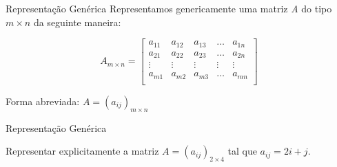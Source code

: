 \documentclass[aspectratio=169,xcolor=dvipsnames]{beamer}
\begin{document}

\begin{frame}{Representação Genérica}
  Representamos genericamente uma matriz \textit{A} do tipo $m \times n$ da seguinte maneira:

  \begin{equation*}
    A_{m \times n} = \begin{bmatrix}
      a_{11} & a_{12} & a_{13} & \dots & a_{1n} \\
      a_{21} & a_{22} & a_{23} & \dots & a_{2n} \\
      \vdots & \vdots & \vdots & \vdots & \vdots \\
      a_{m1} & a_{m2} & a_{m3} & \dots & a_{mn} \\
    \end{bmatrix}
  \end{equation*}

  Forma abreviada: $A = (a_{ij})_{m \times n}$
  
\end{frame}


\begin{frame}{Representação Genérica}
  \begin{examples}
    Representar explicitamente a matriz $A = (a_{ij})_{2 \times 4}$ tal que $a_{ij} = 2i + j$.
  \end{examples}
\end{frame}

\end{document}
